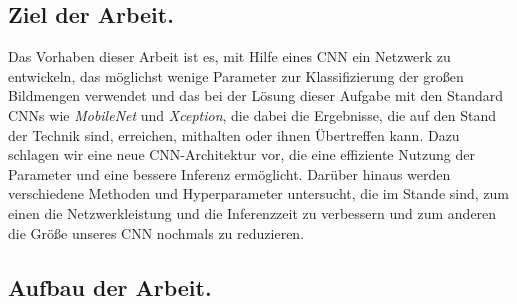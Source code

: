 \documentclass[12pt,a4paper]{scrartcl}
\numberwithin{equation}{section}
\begin{document}
\subsection{Ziel der Arbeit.}
Das Vorhaben dieser Arbeit ist es, mit Hilfe eines \ac{CNN} ein Netzwerk zu entwickeln, das möglichst wenige Parameter zur Klassifizierung der großen Bildmengen verwendet und das bei der Lösung dieser Aufgabe mit den Standard \acsp{CNN} wie \textit{MobileNet} und \textit{Xception}, die dabei die Ergebnisse, die auf den Stand der Technik sind, erreichen, mithalten oder ihnen Übertreffen kann. 
Dazu schlagen wir eine neue CNN-Architektur vor, die eine effiziente Nutzung der Parameter und eine bessere Inferenz ermöglicht. Darüber hinaus werden verschiedene Methoden und Hyperparameter untersucht, die im Stande sind, zum einen die Netzwerkleistung und die Inferenzzeit zu verbessern und zum anderen die Größe unseres \ac{CNN} nochmals zu reduzieren.  


\subsection{Aufbau der Arbeit.}
\end{document}

